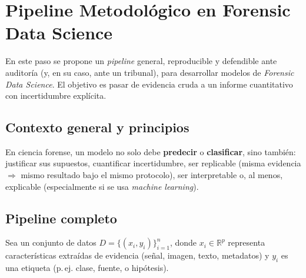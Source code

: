 \documentclass[a4paper,10pt,oneside]{article}
\begin{document}
\section{Pipeline Metodol\'ogico en Forensic Data Science}

En este paso se propone un \textit{pipeline} general, reproducible y defendible ante auditor\'ia (y, en su caso, ante un tribunal), para desarrollar modelos de \textit{Forensic Data Science}. El objetivo es pasar de evidencia cruda a un informe cuantitativo con incertidumbre expl\'icita.

\subsection{Contexto general y principios}

En ciencia forense, un modelo no solo debe \textbf{predecir} o \textbf{clasificar}, sino tambi\'en: justificar sus supuestos, cuantificar incertidumbre, ser replicable (misma evidencia $\Rightarrow$ mismo resultado bajo el mismo protocolo), ser interpretable o, al menos, explicable (especialmente si se usa \textit{machine learning}).

\subsection{Pipeline completo}

Sea un conjunto de datos $D=\{(x_i,y_i)\}_{i=1}^n$, donde $x_i\in\mathbb{R}^p$ representa caracter\'isticas extra\'idas de evidencia (se\~nal, imagen, texto, metadatos) y $y_i$ es una etiqueta (p.\,ej. clase, fuente, o hip\'otesis).
\end{document}
